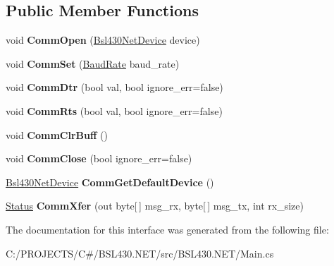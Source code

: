 \subsection*{Public Member Functions}
\begin{DoxyCompactItemize}
\item 
\mbox{\label{interface_b_s_l430___n_e_t_1_1_main_1_1_i_commable_a938e87ac6795849806e41fb79e36d44d}} 
void {\bfseries Comm\+Open} (\mbox{\hyperlink{class_b_s_l430___n_e_t_1_1_bsl430_net_device}{Bsl430\+Net\+Device}} device)
\item 
\mbox{\label{interface_b_s_l430___n_e_t_1_1_main_1_1_i_commable_a99847a308c584f87157748a06b081373}} 
void {\bfseries Comm\+Set} (\mbox{\hyperlink{namespace_b_s_l430___n_e_t_a8d30c263598635a481840944d38aeb70}{Baud\+Rate}} baud\+\_\+rate)
\item 
\mbox{\label{interface_b_s_l430___n_e_t_1_1_main_1_1_i_commable_add41fdc00d9912a0a893c751d877bbc1}} 
void {\bfseries Comm\+Dtr} (bool val, bool ignore\+\_\+err=false)
\item 
\mbox{\label{interface_b_s_l430___n_e_t_1_1_main_1_1_i_commable_af5bbb4a6de46a1eef6bdbba57d236031}} 
void {\bfseries Comm\+Rts} (bool val, bool ignore\+\_\+err=false)
\item 
\mbox{\label{interface_b_s_l430___n_e_t_1_1_main_1_1_i_commable_a204fd9aa13f0f9f0737a74a96a5c3572}} 
void {\bfseries Comm\+Clr\+Buff} ()
\item 
\mbox{\label{interface_b_s_l430___n_e_t_1_1_main_1_1_i_commable_a92bbb113cbc5cc2d2ed8653839d9d988}} 
void {\bfseries Comm\+Close} (bool ignore\+\_\+err=false)
\item 
\mbox{\label{interface_b_s_l430___n_e_t_1_1_main_1_1_i_commable_a31412f5969d144e3b41ab0c1c0c65bf0}} 
\mbox{\hyperlink{class_b_s_l430___n_e_t_1_1_bsl430_net_device}{Bsl430\+Net\+Device}} {\bfseries Comm\+Get\+Default\+Device} ()
\item 
\mbox{\label{interface_b_s_l430___n_e_t_1_1_main_1_1_i_commable_aaaf1171c491d2a6f0c7c5a1d26822564}} 
\mbox{\hyperlink{class_b_s_l430___n_e_t_1_1_status}{Status}} {\bfseries Comm\+Xfer} (out byte\mbox{[}$\,$\mbox{]} msg\+\_\+rx, byte\mbox{[}$\,$\mbox{]} msg\+\_\+tx, int rx\+\_\+size)
\end{DoxyCompactItemize}


The documentation for this interface was generated from the following file\+:\begin{DoxyCompactItemize}
\item 
C\+:/\+P\+R\+O\+J\+E\+C\+T\+S/\+C\#/\+B\+S\+L430.\+N\+E\+T/src/\+B\+S\+L430.\+N\+E\+T/Main.\+cs\end{DoxyCompactItemize}
